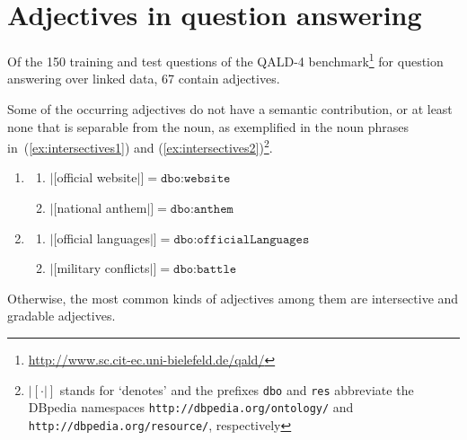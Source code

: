 \documentclass[11pt]{article}
\begin{document}
\section{Adjectives in question answering}

Of the 150 training and test questions of the QALD-4 benchmark\footnote{\url{http://www.sc.cit-ec.uni-bielefeld.de/qald/}} 
for question answering over linked data, 67 contain adjectives. 

Some of the occurring adjectives do not have a semantic contribution, or at least none that is separable from the noun, 
as exemplified in the noun phrases in~(\ref{ex:intersectives1}) and (\ref{ex:intersectives2})\footnote{$|[\cdot|]$ stands for 
`denotes' and the prefixes \texttt{dbo} and \texttt{res} abbreviate the DBpedia namespaces \texttt{http://dbpedia.org/ontology/}
and \texttt{http://dbpedia.org/resource/}, respectively}.
\begin{enumerate}
\item \begin{enumerate}
 \item $|[$official website$|]=\texttt{dbo:website}$
 \item $|[$national anthem$|]=\texttt{dbo:anthem}$
 \end{enumerate}
 \label{ex:intersectives1}
\item \begin{enumerate}
 \item $|[$official languages$|]=\texttt{dbo:officialLanguages}$
 \item $|[$military conflicts$|]=\texttt{dbo:battle}$ 
 \end{enumerate}
 \label{ex:intersectives2}
\end{enumerate}

Otherwise, the most common kinds of adjectives among them are intersective and gradable adjectives.
\end{document}
